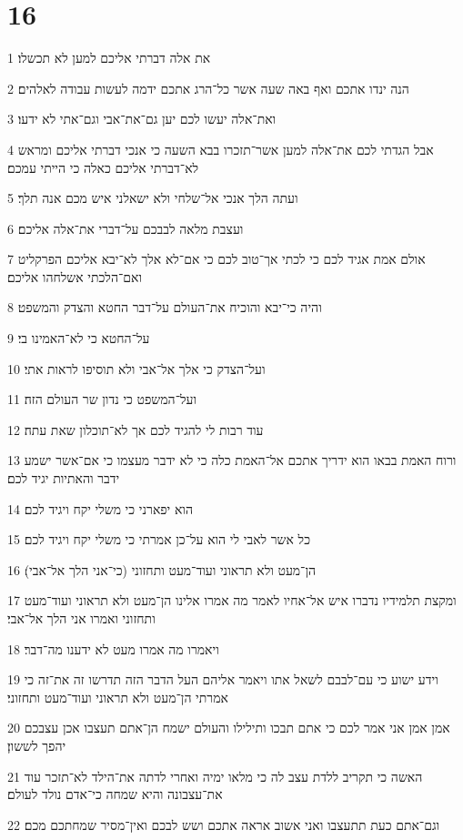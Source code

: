 \chapter{16}

\par 1 את אלה דברתי אליכם למען לא תכשלו׃
\par 2 הנה ינדו אתכם ואף באה שעה אשר כל־הרג אתכם ידמה לעשות עבודה לאלהים׃
\par 3 ואת־אלה יעשו לכם יען גם־את־אבי וגם־אתי לא ידעו׃
\par 4 אבל הגדתי לכם את־אלה למען אשר־תזכרו בבא השעה כי אנכי דברתי אליכם ומראש לא־דברתי אליכם כאלה כי הייתי עמכם׃
\par 5 ועתה הלך אנכי אל־שלחי ולא ישאלני איש מכם אנה תלך׃
\par 6 ועצבת מלאה לבבכם על־דברי את־אלה אליכם׃
\par 7 אולם אמת אגיד לכם כי לכתי אך־טוב לכם כי אם־לא אלך לא־יבא אליכם הפרקליט ואם־הלכתי אשלחהו אליכם׃
\par 8 והיה כי־יבא והוכיח את־העולם על־דבר החטא והצדק והמשפט׃
\par 9 על־החטא כי לא־האמינו בי׃
\par 10 ועל־הצדק כי אלך אל־אבי ולא תוסיפו לראות אתי׃
\par 11 ועל־המשפט כי נדון שר העולם הזה׃
\par 12 עוד רבות לי להגיד לכם אך לא־תוכלון שאת עתה׃
\par 13 ורוח האמת בבאו הוא ידריך אתכם אל־האמת כלה כי לא ידבר מעצמו כי אם־אשר ישמע ידבר והאתיות יגיד לכם׃
\par 14 הוא יפארני כי משלי יקח ויגיד לכם׃
\par 15 כל אשר לאבי לי הוא על־כן אמרתי כי משלי יקח ויגיד לכם׃
\par 16 הן־מעט ולא תראוני ועוד־מעט ותחזוני (כי־אני הלך אל־אבי)׃
\par 17 ומקצת תלמידיו נדברו איש אל־אחיו לאמר מה אמרו אלינו הן־מעט ולא תראוני ועוד־מעט ותחזוני ואמרו אני הלך אל־אבי׃
\par 18 ויאמרו מה אמרו מעט לא ידענו מה־דבר׃
\par 19 וידע ישוע כי עם־לבבם לשאל אתו ויאמר אליהם העל הדבר הזה תדרשו זה את־זה כי אמרתי הן־מעט ולא תראוני ועוד־מעט ותחזוני׃
\par 20 אמן אמן אני אמר לכם כי אתם תבכו ותילילו והעולם ישמח הן־אתם תעצבו אכן עצבכם יהפך לששון׃
\par 21 האשה כי תקריב ללדת עצב לה כי מלאו ימיה ואחרי לדתה את־הילד לא־תזכר עוד את־עצבונה והיא שמחה כי־אדם נולד לעולם׃
\par 22 וגם־אתם כעת תתעצבו ואני אשוב אראה אתכם ושש לבכם ואין־מסיר שמחתכם מכם׃

